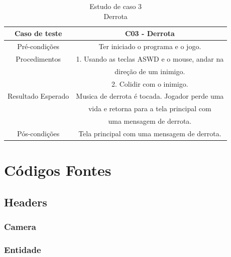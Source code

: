 \begin{table}[h]
\begin{center}
\begin{tabular}{|c|c|}
\hline 
Caso de teste & C03 - Derrota\tabularnewline
\hline 
Pré-condições & Ter iniciado o programa e o jogo.\tabularnewline
\hline 
Procedimentos & 1. Usando as teclas ASWD e o mouse, andar na \\ & direção de um inimigo.\tabularnewline
\cline{1-1} 
 & 2. Colidir com o inimigo.\tabularnewline
\hline 
Resultado Esperado & Musica de derrota é tocada. Jogador perde uma\\ & vida e retorna para
a tela principal com\\ & uma mensagem de derrota.\tabularnewline
\hline 
Pós-condições & Tela principal com uma mensagem de derrota.\tabularnewline
\hline 
\end{tabular}
\caption{Estudo de caso 3 \\ Derrota}
\label{C03}
\end{center}
\end{table}

\section{Códigos Fontes}\label{src}

%
\subsection{Headers}\label{.h}

\subsubsection{Camera}

\subsubsection{Entidade}

